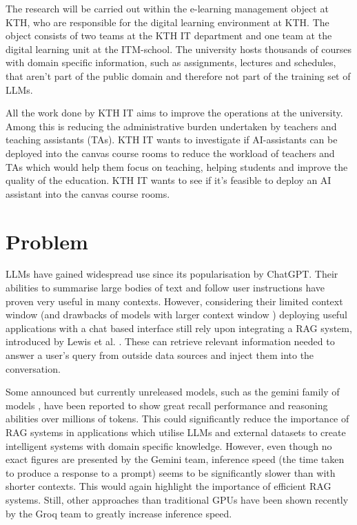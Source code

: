 The research will be carried out within the e-learning management object at KTH, who are responsible for the digital learning environment at KTH. The object consists of two teams at the KTH IT department and one team at the digital learning unit at the ITM-school. The university hosts thousands of courses with domain specific information, such as 
assignments, lectures and schedules, that aren’t part of the public domain and therefore not part of the training set of LLMs.


All the work done by KTH IT aims to improve the operations at the university. Among this is reducing the administrative burden undertaken by teachers and teaching assistants (TAs). KTH IT wants to investigate if AI-assistants can be deployed into the canvas course rooms to reduce the workload of teachers and TAs which would help them focus on teaching, helping students and improve the quality of the education. KTH IT wants to see if it’s feasible to deploy an AI assistant into the canvas course rooms.


\section{Problem}
\label{sec:problem}




\gls{LLM}s have gained widespread use since its popularisation by ChatGPT. Their abilities to summarise large bodies of text and follow user instructions have proven very useful in many contexts. However, considering their limited context window (and drawbacks of models with larger context window \cite{liu_lost_2024}) deploying useful applications with a chat based interface still rely upon integrating a \gls{RAG} system, introduced by Lewis et al. \cite{lewis_retrieval-augmented_2020}. These can retrieve relevant information needed to answer a user's query from outside data sources and inject them into the conversation.


Some announced but currently unreleased models, such as the gemini family of models \cite{gemini_team_gemini_2024}, have been reported to show great recall performance and reasoning abilities over millions of tokens. This could significantly reduce the importance of \gls{RAG} systems in applications which utilise \gls{LLM}s and external datasets to create intelligent systems with domain specific knowledge. However, even though no exact figures are presented by the Gemini team, inference speed (the time taken to produce a response to a prompt) seems to be significantly slower than with shorter contexts. This would again highlight the importance of efficient \gls{RAG} systems. Still, other approaches than traditional GPUs have been shown recently \cite{abts_software-defined_2022} by the Groq team to greatly increase inference speed.



